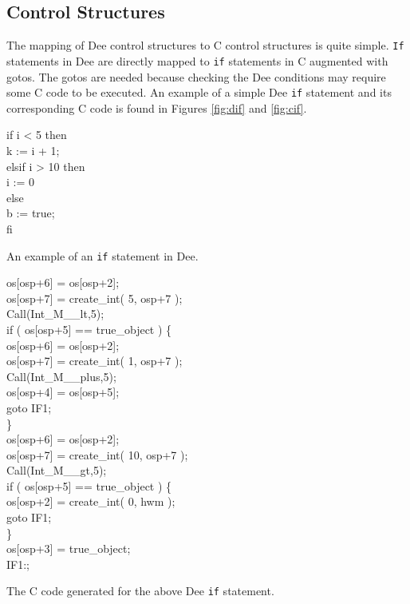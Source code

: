 \subsection{Control Structures}

The mapping of Dee control structures to C control structures is quite
simple.  {\tt If} statements in Dee are directly mapped to {\tt if}
statements in C augmented with gotos.  The gotos are needed because
checking the Dee conditions may require some C code to be executed.
An example of a simple Dee {\tt if} statement and its corresponding C
code is found in Figures \ref{fig:dif} and \ref{fig:cif}.

\begin{shortfigure}
\begin{prog}
\>    if i < 5 then      \\
\>\>      k := i + 1;    \\
\>    elsif i > 10 then  \\
\>\>      i := 0         \\
\>    else               \\
\>\>      b := true;     \\
\>    fi
\end{prog}
\caption{An example of an {\tt if} statement in Dee.}
\label{fig:dif}
\end{shortfigure}

\begin{shortfigure}
\begin{prog}
\>    os[osp+6] = os[osp+2];                 \\
\>    os[osp+7] = create\_int( 5, osp+7 );   \\
\>    Call(Int\_M\_\_lt,5);                  \\
\>    if ( os[osp+5] == true\_object )  \{   \\
\>\>    os[osp+6] = os[osp+2];               \\
\>\>    os[osp+7] = create\_int( 1, osp+7 ); \\
\>\>    Call(Int\_M\_\_plus,5);              \\
\>\>    os[osp+4] = os[osp+5];               \\
\>\>    goto IF1;                            \\
\>    \}                                     \\
\>    os[osp+6] = os[osp+2];                 \\
\>    os[osp+7] = create\_int( 10, osp+7 );  \\
\>    Call(Int\_M\_\_gt,5);                  \\
\>    if ( os[osp+5] == true\_object )  \{   \\
\>\>    os[osp+2] = create\_int( 0, hwm );   \\
\>\>    goto IF1;                            \\
\>    \}                                     \\
\>    os[osp+3] = true\_object;              \\
\>    IF1:;
\end{prog}
\caption{The C code generated for the above Dee {\tt if} statement.}
\label{fig:cif}
\end{shortfigure}


